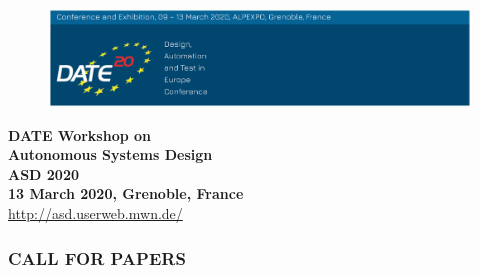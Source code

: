 \documentclass[a4paper,10pt] {article}
\begin{document}
\begin{figure}
\hspace{-0.5cm}
  \includegraphics[scale=0.235]{images/header3.png}
\end{figure}


\begin{center}

\Large{\textbf{DATE Workshop on}} \\ \LARGE{\textbf{Autonomous Systems Design \\ASD 2020}}   \\ \vspace{+0.3 cm}
\large{{\textbf{13 March 2020, Grenoble, France }}} \\ \vspace{+0.2 cm}\small{{\url{http://asd.userweb.mwn.de/}}}
\end{center}

%

\subsubsection*{CALL FOR PAPERS}

\end{document}
